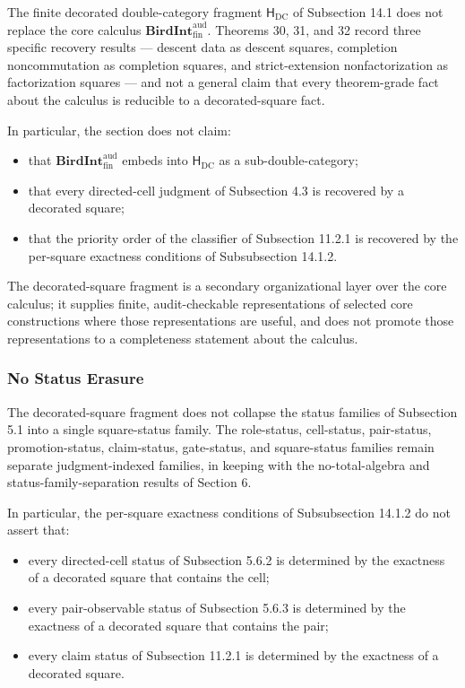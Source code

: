 \documentclass[11pt]{article}
\providecommand{\tightlist}{}
\theoremstyle{definition}
\begin{document}
The finite decorated double-category fragment \(\mathsf H_{\mathrm{DC}}\) of Subsection 14.1 does not replace the core calculus \(\mathbf{BirdInt}^{\mathrm{aud}}_{\mathrm{fin}}\). Theorems 30, 31, and 32 record three specific recovery results --- descent data as descent squares, completion noncommutation as completion squares, and strict-extension nonfactorization as factorization squares --- and not a general claim that every theorem-grade fact about the calculus is reducible to a decorated-square fact.

In particular, the section does not claim:

\begin{itemize}
\tightlist
\item
  that \(\mathbf{BirdInt}^{\mathrm{aud}}_{\mathrm{fin}}\) embeds into \(\mathsf H_{\mathrm{DC}}\) as a sub-double-category;
\item
  that every directed-cell judgment of Subsection 4.3 is recovered by a decorated square;
\item
  that the priority order of the classifier of Subsection 11.2.1 is recovered by the per-square exactness conditions of Subsubsection 14.1.2.
\end{itemize}

The decorated-square fragment is a secondary organizational layer over the core calculus; it supplies finite, audit-checkable representations of selected core constructions where those representations are useful, and does not promote those representations to a completeness statement about the calculus.

\subsubsection{No Status Erasure}

The decorated-square fragment does not collapse the status families of Subsection 5.1 into a single square-status family. The role-status, cell-status, pair-status, promotion-status, claim-status, gate-status, and square-status families remain separate judgment-indexed families, in keeping with the no-total-algebra and status-family-separation results of Section 6.

In particular, the per-square exactness conditions of Subsubsection 14.1.2 do not assert that:

\begin{itemize}
\tightlist
\item
  every directed-cell status of Subsection 5.6.2 is determined by the exactness of a decorated square that contains the cell;
\item
  every pair-observable status of Subsection 5.6.3 is determined by the exactness of a decorated square that contains the pair;
\item
  every claim status of Subsection 11.2.1 is determined by the exactness of a decorated square.
\end{itemize}
\end{document}
